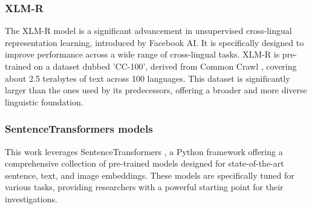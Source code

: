 \subsubsection{\ac{XLM-R}} \label{model:xlm-roberta}
The \ac{XLM-R} model \cite{conneau2020unsupervised} is a significant advancement in unsupervised cross-lingual representation learning, introduced by Facebook AI.
It is specifically designed to improve performance across a wide range of cross-lingual tasks.
\ac{XLM-R} is pre-trained on a dataset dubbed 'CC-100', derived from Common Crawl \cite{commoncrawl}, covering about 2.5 terabytes of text across 100 languages.
This dataset is significantly larger than the ones used by its predecessors, offering a broader and more diverse linguistic foundation.

\subsubsection{SentenceTransformers models} \label{model:st-multilingual}

This work leverages SentenceTransformers \cite{reimers2019sentencebert}, a Python framework offering a comprehensive collection of pre-trained models designed for state-of-the-art sentence, text, and image embeddings.
These models are specifically tuned for various tasks, providing researchers with a powerful starting point for their investigations.


